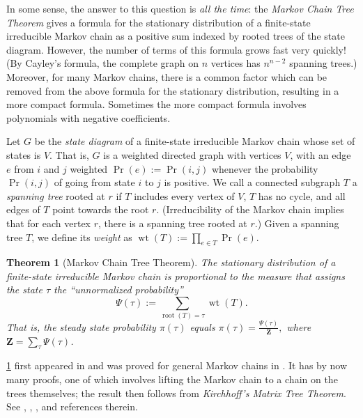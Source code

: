 \documentclass[11pt]{amsart}
\DeclareMathOperator{\wt}{wt}
\DeclareMathOperator{\rt}{root}
\newtheorem{theorem}{Theorem}[section]
\theoremstyle{definition}
\theoremstyle{remark}
\begin{document}
In some sense, the answer to this question is \emph{all the time}: 
 the \emph{Markov Chain Tree Theorem} gives a formula for the stationary 
distribution of a finite-state irreducible Markov chain as a positive
sum indexed by rooted trees
of the state diagram.  However, the number of terms of this formula grows fast
very quickly! (By Cayley's formula,
the complete graph on $n$ vertices has $n^{n-2}$ spanning trees.)
Moreover, for many Markov chains, there is a 
common factor which can be removed from the above formula for the 
stationary distribution, resulting in a more
compact formula.  Sometimes the more compact formula involves polynomials
with negative coefficients.

Let $G$ be the \emph{state diagram} of a finite-state irreducible Markov chain whose
set of states is $V$.
That is, $G$ is a weighted directed graph with vertices $V$,  with an edge $e$ from
$i$ and $j$  weighted $\Pr(e):=\Pr(i,j)$ whenever the probability $\Pr(i,j)$ of going
from state $i$ to $j$ is positive.
We call a connected subgraph $T$ a \emph{spanning tree} rooted at $r$ 
if $T$ includes every vertex of $V$, $T$ has no cycle, and all edges of $T$
point towards the root $r$.  (Irreducibility of the Markov chain implies that for 
each vertex $r$, there is a spanning tree rooted at $r$.)
Given a spanning tree $T$, we define its \emph{weight} as
$\wt(T):=\prod_{e\in T} \Pr(e).$

\begin{theorem}[Markov Chain Tree Theorem] \label{thm:Markov}
The stationary distribution of a finite-state irreducible Markov chain is proportional
	to the measure that assigns the state $\tau$ the %
	 ``unnormalized probability''
	$$\Psi(\tau):= \sum_{\rt(T)=\tau} \wt(T).$$
	That is, the steady state probability $\pi(\tau)$ equals
	$\pi(\tau) = \frac{\Psi(\tau)}{\mathbf{Z}},$
	where $\mathbf{Z} = \sum_{\tau} \Psi(\tau)$.
\end{theorem}
\cref{thm:Markov} first appeared in \cite{Hill} %
and was proved for general Markov chains in \cite{Leighton}.
It has by now many proofs, one of which involves lifting the Markov chain to a chain on the trees
themselves; the result then follows from 
\emph{Kirchhoff's Matrix Tree Theorem}.  
See
\cite{Anantharam}, 
\cite{Lyons}, 
\cite{Pitman},
and references therein.  
\end{document}
